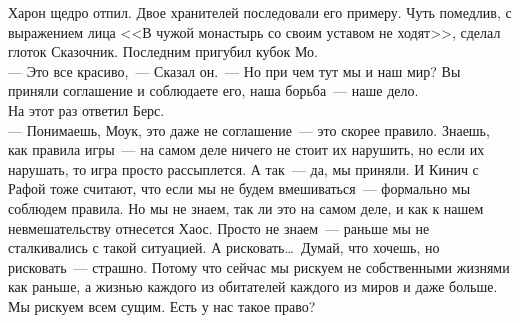 Харон щедро отпил. Двое хранителей последовали его примеру. Чуть помедлив, с 
выражением лица <<В чужой монастырь со своим уставом не ходят>>, сделал глоток 
Сказочник. Последним пригубил кубок Мо.\\
--- Это все красиво,~--- Сказал он.~--- Но при чем тут мы и наш мир? Вы приняли 
соглашение и соблюдаете его, наша борьба~--- наше дело.\\
На этот раз ответил Берс.\\
--- Понимаешь, Моук, это даже не соглашение~--- это скорее правило. Знаешь, как 
правила игры~--- на самом деле ничего не стоит их нарушить, но если их 
нарушать, то игра просто рассыплется. А так~--- да, мы приняли. И Кинич с Рафой тоже 
считают, что если мы не будем вмешиваться~--- формально мы соблюдем правила. Но 
мы не знаем, так ли это на самом деле, и как к нашем невмешательству отнесется 
Хаос. Просто не знаем~--- раньше мы не сталкивались с такой ситуацией. А 
рисковать\ldots\ Думай, что хочешь, но рисковать~--- страшно. Потому что сейчас 
мы рискуем не собственными жизнями как раньше, а жизнью каждого из обитателей 
каждого из миров и даже больше. Мы рискуем всем сущим. Есть у нас такое право?

